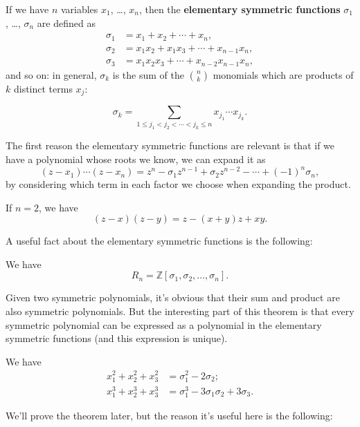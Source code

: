 \begin{definition}
If we have $n$ variables $x_1$, \ldots, $x_n$, then the \textbf{elementary symmetric functions} $\sigma_1$, \ldots, $\sigma_n$ are defined as 
\begin{align*}
    \sigma_1 &= x_1 + x_2 + \cdots + x_n, \\
    \sigma_2 &= x_1x_2 + x_1x_3 + \cdots + x_{n-1}x_n, \\
    \sigma_3 &= x_1x_2x_3 + \cdots + x_{n-2}x_{n-1}x_n,
\end{align*}
and so on: in general, $\sigma_k$ is the sum of the $\binom{n}{k}$ monomials which are products of $k$ distinct terms $x_j$:

\[\sigma_k = \sum_{1 \leq j_1 < j_2 < \cdots < j_k \leq n} x_{j_1} \cdots x_{j_k}.\]
\end{definition}

The first reason the elementary symmetric functions are relevant is that if we have a polynomial whose roots we know, we can expand it as \[(z - x_1)\cdots (z - x_n) = z^n - \sigma_1z^{n - 1} + \sigma_2z^{n - 2} - \cdots + (-1)^n\sigma_n,\] by considering which term in each factor we choose when expanding the product. 

\begin{example}
    If $n = 2$, we have \[(z - x)(z - y) = z - (x + y)z + xy.\] 
\end{example}

A useful fact about the elementary symmetric functions is the following:

\begin{theorem}
    We have \[R_n = \mathbb{Z}[\sigma_1, \sigma_2, \ldots, \sigma_n].\] 
\end{theorem}

Given two symmetric polynomials, it's obvious that their sum and product are also symmetric polynomials. But the interesting part of this theorem is that every symmetric polynomial can be expressed as a polynomial in the elementary symmetric functions (and this expression is unique). 

\begin{example}
    We have 
    \begin{align*}
        x_1^2 + x_2^2 + x_3^2 &= \sigma_1^2 - 2\sigma_2; \\
        x_1^3 + x_2^3 + x_3^3 &= \sigma_1^3 - 3\sigma_1\sigma_2 + 3\sigma_3.
    \end{align*}
\end{example}

We'll prove the theorem later, but the reason it's useful here is the following:

